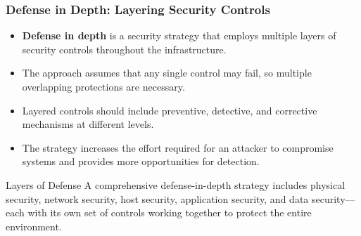 \documentclass{beamer}
\begin{document}
\begin{frame}
    \frametitle{Defense in Depth: Layering Security Controls}
    \begin{itemize}
        \item \textbf{Defense in depth} is a security strategy that employs multiple layers of security controls throughout the infrastructure.
        \item The approach assumes that any single control may fail, so multiple overlapping protections are necessary.
        \item Layered controls should include preventive, detective, and corrective mechanisms at different levels.
        \item The strategy increases the effort required for an attacker to compromise systems and provides more opportunities for detection.
    \end{itemize}
    
    \begin{alertblock}{Layers of Defense}
        A comprehensive defense-in-depth strategy includes physical security, network security, host security, application security, and data security—each with its own set of controls working together to protect the entire environment.
    \end{alertblock}
\end{frame}
\end{document}
